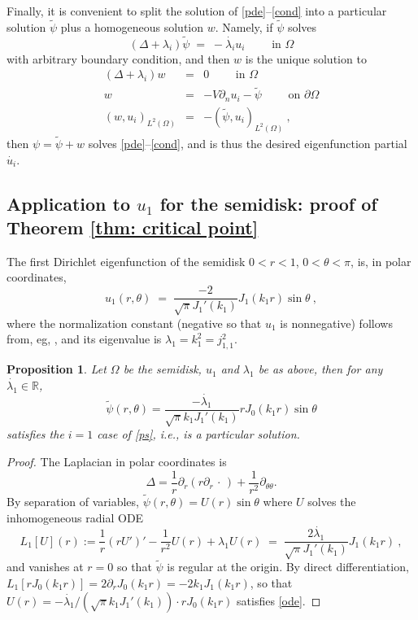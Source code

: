 \documentclass{amsart}
\newcommand{\be}{\begin{equation}}
\newcommand{\ee}{\end{equation}}
\newcommand{\bea}{\begin{eqnarray}}
\newcommand{\eea}{\end{eqnarray}}
\newcommand{\R}{\mathbb{R}}
\newcommand{\pO}{{\partial\Omega}}
\newcommand{\dn}{{\partial_n}}
\theoremstyle{plain}
\newtheorem{prop}[theorem]{Proposition}
\begin{document}
Finally, it is convenient to split the solution of \eqref{pde}--\eqref{cond}
into a particular solution $\tilde \psi$ plus a homogeneous solution
$w$. Namely, if $\tilde \psi$ solves
\be
(\Delta + \lambda_i)\tilde \psi \;=\; -\dot{\lambda_i} u_i
\qquad \mbox{ in } \Omega
\label{ps}
\ee
with arbitrary boundary condition, and then $w$ is the unique solution to
  \bea
  (\Delta + \lambda_i)w &=& 0 \qquad\mbox{ in } \Omega
  \label{wpde}
  \\
  w &=& -V \dn u_i - \tilde\psi \qquad\mbox{ on } \pO
  \label{wbc}
  \\
  (w,u_i)_{L^2(\Omega)} &=& -(\tilde\psi, u_i)_{L^2(\Omega)}~,
  \label{wcond}
  \eea
  then $\psi=\tilde\psi + w$ solves \eqref{pde}--\eqref{cond},
  and is thus the desired eigenfunction partial $\dot{u_i}$.


  
\subsection{Application to $u_1$ for the semidisk:
    proof of Theorem \ref{thm: critical point}}
\label{s:appl}

The first Dirichlet eigenfunction of the semidisk $0<r<1$, $0<\theta<\pi$, is,
in polar coordinates,
\be
u_1(r,\theta) \;=\; \frac{-2}{\sqrt{\pi} J_1'(k_1)} J_1(k_1 r) \sin\theta~,
\label{u1}
\ee
where the normalization constant (negative so that $u_1$ is nonnegative)
follows from, eg, \cite[(10.22.37)]{dlmf},
and its eigenvalue is $\lambda_1 = k_1^2 = j_{1,1}^2$.

\begin{prop}  %
  Let $\Omega$ be the semidisk, $u_1$ and $\lambda_1$
  be as above, then for any $\dot{\lambda_1}\in\R$,
\be
\tilde\psi(r,\theta) = \frac{-\dot{\lambda_1}}{\sqrt{\pi}k_1J_1'(k_1)}
rJ_0(k_1 r)
\sin\theta
\label{psit}
\ee
satisfies the $i=1$ case of \eqref{ps}, i.e., is a particular solution.
\label{p:psit}
\end{prop}
\begin{proof}
The Laplacian in polar coordinates is
$$
\Delta = \frac{1}{r}\partial_r(r \partial_r \,\cdot\,) + \frac{1}{r^2}\partial_{\theta\theta}.
$$
By separation of variables, $\tilde\psi (r,\theta) = U(r) \sin\theta$
where $U$ solves the inhomogeneous radial ODE
\be
L_1[U](r) := \frac{1}{r}(r U')' - \frac{1}{r^2} U(r) + \lambda_1 U(r)
\;=\;
\frac{2\dot{\lambda_1}}{\sqrt{\pi} J_1'(k_1)} J_1(k_1 r)
~,
\label{ode}
\ee
and vanishes at $r=0$ so that $\tilde\psi$ is regular at the origin.
By direct differentiation,
$L_1[rJ_0(k_1 r)] = 2\partial_r J_0(k_1 r) = -2k_1 J_1(k_1 r)$,
so that
$U(r) = -\dot{\lambda_1}/(\sqrt{\pi}k_1J_1'(k_1)) \cdot r J_0(k_1 r)$
satisfies \eqref{ode}.
\end{proof}
\end{document}
